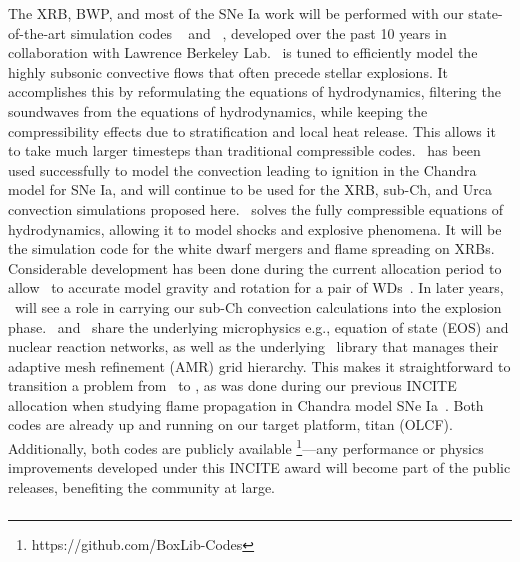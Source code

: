 \documentclass[11pt,letterpaper,english]{article}
\begin{document}
The XRB, BWP, and most of the SNe Ia work will be performed with our
state-of-the-art simulation codes \maestro~\cite{multilevel} and
\castro~\cite{castro:I}, developed over the past 10 years in
collaboration with Lawrence Berkeley Lab.  \maestro\ is tuned to
efficiently model the highly subsonic convective flows that often
precede stellar explosions.  It accomplishes this by reformulating the
equations of hydrodynamics, filtering the soundwaves from the
equations of hydrodynamics, while keeping the compressibility effects
due to stratification and local heat release.  This allows it to take
much larger timesteps than traditional compressible codes.
\maestro\ has been used successfully to model the convection leading
to ignition in the Chandra model for SNe Ia, and will continue to be
used for the XRB, sub-Ch, and Urca convection simulations proposed
here.  \castro\ solves the fully compressible equations of
hydrodynamics, allowing it to model shocks and explosive phenomena.
It will be the simulation code for the white dwarf mergers and flame
spreading on XRBs.  Considerable development has been done during the
current allocation period to allow \castro\ to accurate model gravity
and rotation for a pair of WDs~\cite{katz:2016}.  In later years, \castro\
will see a role in carrying our sub-Ch convection calculations into
the explosion phase.  \maestro\ and \castro\ share the underlying
microphysics e.g., equation of state (EOS) and nuclear reaction
networks, as well as the underlying \boxlib\ library that manages
their adaptive mesh refinement (AMR) grid hierarchy.  This makes it
straightforward to transition a problem from \maestro\ to \castro, as
was done during our previous INCITE allocation when studying flame
propagation in Chandra model SNe Ia~\cite{Mal14}.  Both codes are
already up and running on our target platform, titan (OLCF).
Additionally, both codes are publicly available%
\footnote{https://github.com/BoxLib-Codes}---any performance or
physics improvements developed under this INCITE award will become
part of the public releases, benefiting the community at large.

\subsubsection{\flash}

\subsubsection{\chimera}
\end{document}
